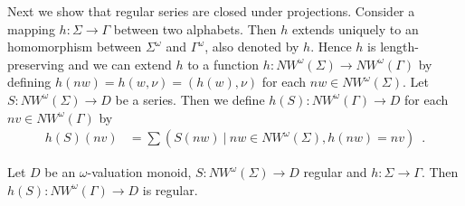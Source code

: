 \documentclass[runningheads, envcountsame, a4paper]{llncs}
\begin{document}
Next we show that regular series are closed under projections. Consider a mapping $h:\Sigma \rightarrow \Gamma$ between two alphabets. Then $h$ extends uniquely to an homomorphism between $\Sigma^\omega$ and $\Gamma^\omega$, also denoted by $h$. Hence $h$ is length-preserving and we can extend $h$ to a function $h:\mathit{NW^\omega}(\Sigma) \rightarrow \mathit{NW^\omega}(\Gamma)$ by defining $h(\mathit{nw})=h(w,\nu)=(h(w),\nu)$ for each $\mathit{nw}\in \mathit{NW^\omega}(\Sigma)$.
Let $S:\mathit{NW^\omega}(\Sigma) \rightarrow D$ be a series. Then we define $h(S):\mathit{NW^\omega}(\Gamma) \rightarrow D$ for each $\mathit{nv}\in \mathit{NW^\omega}(\Gamma)$ by
\begin{align*}
h(S)(\mathit{nv})&=\sum(S(\mathit{nw})~|~\mathit{nw} \in \mathit{NW^\omega}(\Sigma), h(\mathit{nw})=\mathit{nv}) \enspace.	
\end{align*}
\begin{Satz}
	\label{hom}
	Let $D$ be an $\omega$-valuation monoid, $S:\mathit{NW^\omega}(\Sigma) \rightarrow D$ regular and $h:\Sigma \rightarrow \Gamma$. Then $h(S):\mathit{NW^\omega}(\Gamma) \rightarrow D$ is regular.
\end{Satz}
\end{document}

